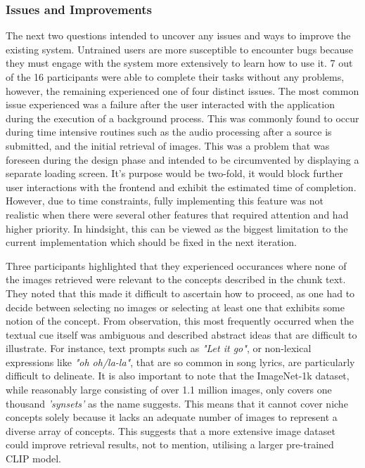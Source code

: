 \documentclass{l4proj}
\begin{document}
\subsubsection{Issues and Improvements}
The next two questions intended to uncover any issues and ways to improve the existing system. Untrained users are more susceptible to encounter bugs because they must engage with the system more extensively to learn how to use it. 7 out of the 16 participants were able to complete their tasks without any problems, however, the remaining experienced one of four distinct issues. The most common issue experienced was a failure after the user interacted with the application during the execution of a background process. This was commonly found to occur during time intensive routines such as the audio processing after a source is submitted, and the initial retrieval of images. This was a problem that was foreseen during the design phase and intended to be circumvented by displaying a separate loading screen. It's purpose would be two-fold, it would block further user interactions with the frontend and exhibit the estimated time of completion. However, due to time constraints, fully implementing this feature was not realistic when there were several other features that required attention and had higher priority. In hindsight, this can be viewed as the biggest limitation to the current implementation which should be fixed in the next iteration.

Three participants highlighted that they experienced occurances where none of the images retrieved were relevant to the concepts described in the chunk text. They noted that this made it difficult to ascertain how to proceed, as one had to decide between selecting no images or selecting at least one that exhibits some notion of the concept. From observation, this most frequently occurred when the textual cue itself was ambiguous and described abstract ideas that are difficult to illustrate. For instance, text prompts such as \emph{"Let it go"}, or non-lexical expressions like \emph{"oh oh/la-la"}, that are so common in song lyrics, are particularly difficult to delineate. It is also important to note that the ImageNet-1k dataset, while reasonably large consisting of over 1.1 million images, only covers one thousand \emph{'synsets'} as the name suggests. This means that it cannot cover niche concepts solely because it lacks an adequate number of images to represent a diverse array of concepts. This suggests that a more extensive image dataset could improve retrieval results, not to mention, utilising a larger pre-trained CLIP model.
\end{document}
